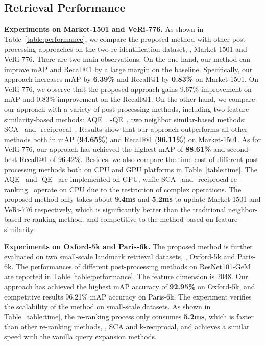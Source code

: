 \documentclass[10pt,twocolumn,letterpaper]{article}
\begin{document}
\subsection{Retrieval Performance} \label{sec:retrieval performance}
\noindent\textbf{Experiments on Market-1501 and VeRi-776.}
As shown in Table~\ref{table:performance}, we compare the proposed method with other post-processing approaches on the two re-identification dataset, \ie, Market-1501 and VeRi-776.
There are two main observations. On the one hand, our method can improve mAP and Recall@1 by a large margin on the baseline. Specifically, our approach increases mAP by \textbf{6.39\%}  and Recall@1 by \textbf{0.83\%} on Market-1501.
On VeRi-776, we observe that the proposed approach gains 9.67\% improvement on mAP and 0.83\% improvement on the Recall@1.
On the other hand, we compare our approach with a variety of post-processing methods, including two feature similarity-based methods: AQE~\cite{chum2007total}, -QE~\cite{radenovic2018fine}, two neighbor similar-based methods:
SCA~\cite{bai2016sparse} and -reciprocal~\cite{zhong2017re}. 
Results show that our approach outperforms all other methods both in mAP (\textbf{94.65\%}) and Recall@1 (\textbf{96.11\%}) on Market-1501. 
As for VeRi-776, our approach has achieved the highest mAP of \textbf{88.61\%} and second-best Recall@1 of 96.42\%. 
Besides, we also compare the time cost of different post-processing methods both on CPU and GPU platforms in Table~\ref{table:time}. 
The AQE~\cite{chum2007total} and -QE~\cite{radenovic2018fine} are implemented on GPU, while SCA~\cite{bai2016sparse} and -reciprocal re-ranking~\cite{zhong2017re} operate on CPU due to the restriction of complex operations. The proposed method only takes about \textbf{9.4ms} and \textbf{5.2ms} to update  Market-1501 and VeRi-776 respectively, which is significantly better than the traditional neighbor-based re-ranking method, and competitive to the method based on feature similarity. 



\noindent\textbf{Experiments on Oxford-5k and Paris-6k.}
The proposed method is further evaluated on two small-scale landmark retrieval datasets, \ie, Oxford-5k and Paris-6k. 
The performances of different post-processing methods on ResNet101-GeM~\cite{radenovic2018fine} are reported in Table \ref{table:performance}. The feature dimension is 2048. Our approach has achieved the highest mAP accuracy of \textbf{92.95\%} on Oxford-5k, and competitive results 96.21\% mAP accuracy on Paris-6k. 
The experiment verifies the scalability of the method on small-scale datasets.  As shown in Table~\ref{table:time}, the re-ranking process only consumes \textbf{5.2ms}, which is faster than other re-ranking methods, \ie, SCA and k-reciprocal, and achieves a similar speed with the vanilla query expansion methods.
\end{document}
